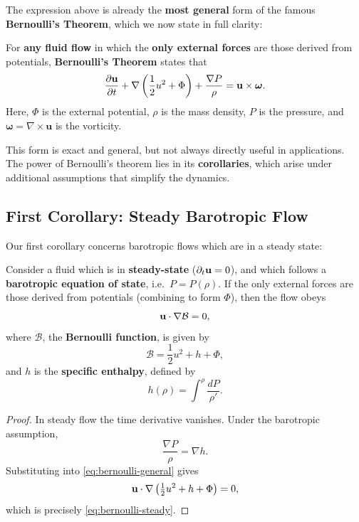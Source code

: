 The expression above is already the \textbf{most general} form of the famous \textbf{Bernoulli's Theorem}, which we now state in full clarity:

\vspace{0.5cm}
\begin{theorem}
For \textbf{any fluid flow} in which the \textbf{only external forces} are those derived from potentials, \textbf{Bernoulli's Theorem} states that
\begin{equation}
    \label{eq:bernoulli-general}
    \frac{\partial {\bf u}}{\partial t} 
    + \nabla\left(\frac{1}{2}u^2 + \Phi\right) 
    + \frac{\nabla P}{\rho} 
    = {\bf u} \times \boldsymbol{\omega}.
\end{equation}
Here, $\Phi$ is the external potential, $\rho$ is the mass density, $P$ is the pressure, and $\boldsymbol{\omega} = \nabla \times \mathbf{u}$ is the vorticity. 
\end{theorem}
\vspace{0.5cm}

This form is exact and general, but not always directly useful in applications. The power of Bernoulli’s theorem lies in its \textbf{corollaries}, which arise under additional assumptions that simplify the dynamics.

\subsection{First Corollary: Steady Barotropic Flow}

Our first corollary concerns barotropic flows which are in a steady state:
\vspace{0.5cm}
\begin{corollary}
Consider a fluid which is in \textbf{steady-state} ($\partial_t {\bf u} = 0$), and which follows a \textbf{barotropic equation of state}, i.e.\ $P = P(\rho)$. If the only external forces are those derived from potentials (combining to form $\Phi$), then the flow obeys
\begin{equation}
    \label{eq:bernoulli-steady}
    {\bf u} \cdot \nabla \mathcal{B} = 0,
\end{equation}
where $\mathcal{B}$, the \textbf{Bernoulli function}, is given by
\[
\mathcal{B} = \frac{1}{2}u^2 + h + \Phi,
\]
and $h$ is the \textbf{specific enthalpy}, defined by
\[
h(\rho) = \int^\rho \frac{dP}{\rho'}.
\]
\end{corollary}

\begin{proof}
In steady flow the time derivative vanishes. Under the barotropic assumption,
\[
\frac{\nabla P}{\rho} = \nabla h.
\]
Substituting into \eqref{eq:bernoulli-general} gives
\[
{\bf u} \cdot \nabla \left( \tfrac{1}{2}u^2 + h + \Phi \right) = 0,
\]
which is precisely \eqref{eq:bernoulli-steady}.
\end{proof}
\vspace{0.5cm}

